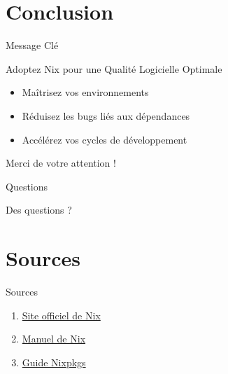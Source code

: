 \documentclass{beamer}
\begin{document}
\section{Conclusion}

\begin{frame}{Message Clé}
	\begin{block}{Adoptez Nix pour une Qualité Logicielle Optimale}
		\begin{itemize}
			\item Maîtrisez vos environnements
			\item Réduisez les bugs liés aux dépendances
			\item Accélérez vos cycles de développement
		\end{itemize}
	\end{block}
	\begin{center}
		\Large Merci de votre attention !
	\end{center}
\end{frame}

\begin{frame}{Questions}
	\begin{center}
		\Large Des questions ?
	\end{center}
\end{frame}

\appendix

\section{Sources}

\begin{frame}{Sources}
	\begin{enumerate}
		\item \href{https://nixos.org/}{Site officiel de Nix}
		\item \href{https://nixos.org/manual/nix/stable/}{Manuel de Nix}
		\item \href{https://nixos.org/manual/nixpkgs/stable/}{Guide Nixpkgs}
	\end{enumerate}
\end{frame}
\end{document}
